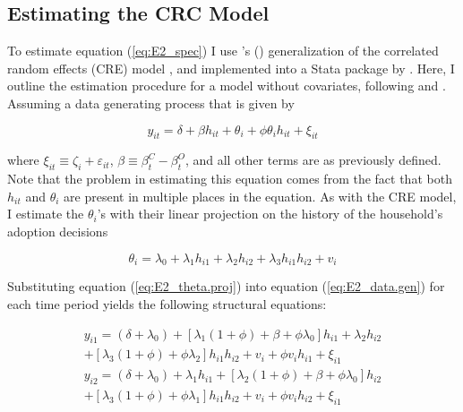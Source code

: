 \documentclass[11pt]{article}
\begin{document}
\subsection{Estimating the CRC Model} \label{sec:E2_est}

To estimate equation (\ref{eq:E2_spec}) I use \citeauthor{suri11}'s (\citeyear{suri11}) generalization of the correlated random effects (CRE) model \citep{chamberlin84}, and implemented into a Stata package by \citet{cabanillas-et.al.18}. Here, I outline the estimation procedure for a model without covariates, following \citet{michler-et.al.18} and \citet{suri11}. Assuming a data generating process that is given by

\begin{equation} \label{eq:E2_data.gen}
    y_{it} = \delta +  \beta h_{it} + \theta_{i} + \phi\theta_{i}h_{it} + \xi_{it}
\end{equation}

where $\xi_{it} \equiv \zeta_i + \varepsilon_{it}$, $\beta \equiv \beta^{C}_{t} - \beta^{O}_{t}$, and all other terms are as previously defined. Note that the problem in estimating this equation comes from the fact that both $h_{it}$ and $\theta_{i}$ are present in multiple places in the equation. As with the \citet{chamberlin84} CRE model, I estimate the $\theta_{i}$’s with their linear projection on the history of the household’s adoption decisions

\begin{equation} \label{eq:E2_theta.proj}
    \theta_{i} = \lambda_{0} +  \lambda_{1}h_{i1} + \lambda_{2}h_{i2} + \lambda_{3}h_{i1}h_{i2} + v_i
\end{equation}

Substituting equation (\ref{eq:E2_theta.proj}) into equation (\ref{eq:E2_data.gen}) for each time period yields the following structural equations:

\begin{equation} \label{eq:E2_struc1}
    \begin{split}
    y_{i1} = (\delta + \lambda_0) + [\lambda_1(1 + \phi) + \beta + \phi \lambda_0]h_{i1} + \lambda_{2}h_{i2} \\
    + [\lambda_3(1 + \phi) + \phi \lambda_2]h_{i1}h_{i2} + v_i + \phi v_{i}h_{i1} + \xi_{i1}
    \end{split}
\end{equation}
\begin{equation} \label{eq:E2_struc2}
    \begin{split}
    y_{i2} = (\delta + \lambda_0) + \lambda_{1}h_{i1} + [\lambda_2(1 + \phi) + \beta + \phi \lambda_0]h_{i2} \\
    + [\lambda_3(1 + \phi) + \phi \lambda_1]h_{i1}h_{i2} + v_i + \phi v_{i}h_{i2} + \xi_{i1}
    \end{split}
\end{equation}
\end{document}

